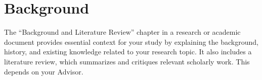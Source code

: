 \chapter{Background}
\label{Ch:Background}
The ``Background and Literature Review'' chapter in a research or academic document provides essential context for your study by explaining the background, history, and existing knowledge related to your research topic. It also includes a literature review, which summarizes and critiques relevant scholarly work.  This depends on your Advisor.